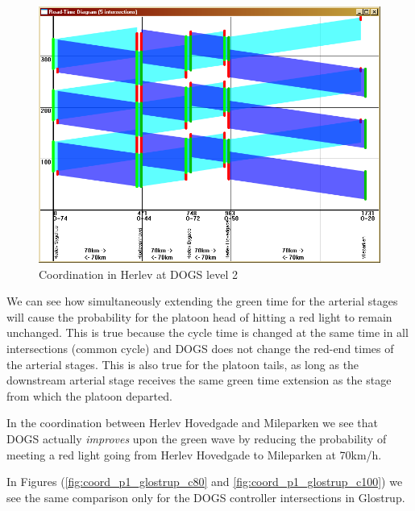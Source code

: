 \begin{figure}[ht]
\begin{center}
\includegraphics[scale=0.30]{coord_p1_herlev_c100.PNG} 
\end{center}
\caption{Coordination in Herlev at DOGS level 2}
\label{fig:coord_p1_herlev_c100}
\end{figure}

We can see how simultaneously extending the green time for the arterial stages will cause the probability for the platoon head of hitting a red light to remain unchanged. This is true because the cycle time is changed at the same time in all intersections (common cycle) and DOGS does not change the red-end times of the arterial stages.
This is also true for the platoon tails, as long as the downstream arterial stage receives the same green time extension as the stage from which the platoon departed.

In the coordination between Herlev Hovedgade and Mileparken we see that DOGS actually \textit{improves} upon the green wave by reducing the probability of meeting a red light going from Herlev Hovedgade to Mileparken at 70km/h.

In Figures (\ref{fig:coord_p1_glostrup_c80} and \ref{fig:coord_p1_glostrup_c100}) we see the same comparison only for the DOGS controller intersections in Glostrup.

